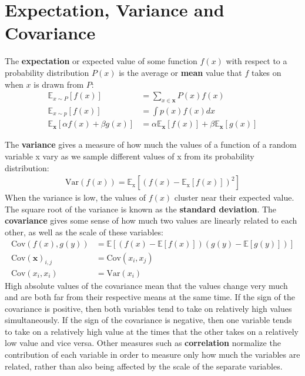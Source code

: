 \documentclass[12pt]{report}
\begin{document}
    \section{Expectation, Variance and Covariance}
        The \textbf{expectation} or expected value of some function $f(x)$ with respect to a probability distribution $P(x)$ is the average or \textbf{mean} value that $f$ takes on when $x$ is drawn from $P$:
        \begin{align}
             \mathbb{E}_{x \sim P}\left[f(x)\right] &= \sum_{x \in \mathbf{x}}{P(x)f(x)} \\[7pt]
             \mathbb{E}_{x \sim p}\left[f(x)\right] &= \int{p(x)f(x)dx} \\[7pt]
             \mathbb{E}_{\mathbf{x}}\left[\alpha f(x) + \beta g(x)\right] &= \alpha\mathbb{E}_{\mathbf{x}}\left[f(x)\right] + \beta\mathbb{E}_{\mathbf{x}}\left[g(x)\right]
        \end{align}
        
        The \textbf{variance} gives a measure of how much the values of a function of a random variable x vary as we sample different values of x from its probability distribution:
        \begin{align}
            \text{Var}(f(x)) = \mathbb{E}_{\text{x}}\left[\left(f(x) - \mathbb{E}_{\text{x}}\left[f(x)\right]\right)^2\right]
        \end{align}
        When the variance is low, the values of $f(x)$ cluster near their expected value. The square root of the variance is known as the \textbf{standard deviation}.
        The \textbf{covariance} gives some sense of how much two values are linearly related to each other, as well as the scale of these variables:
        \begin{align}
            \text{Cov}(f(x), g(y)) &= \mathbb{E}\left[(f(x) - \mathbb{E}[f(x)])(g(y) - \mathbb{E}[g(y)])\right] \\
            \text{Cov}(\boldsymbol{x})_{i,j} &= \text{Cov}(x_i, x_j) \\
            \text{Cov}(x_i, x_i) &= \text{Var}(x_i)
        \end{align}
        High absolute values of the covariance mean that the values change very much and are both far from their respective means at the same time. If the sign of the covariance is positive, then both variables tend to take on relatively high values simultaneously. If the sign of the covariance is negative, then one variable tends to take on a relatively high value at the times that the other takes on a relatively low value and vice versa. Other measures such as \textbf{correlation} normalize the contribution of each variable in order to measure only how much the variables are related, rather than also being affected by the scale of the separate variables.
        
\end{document}
